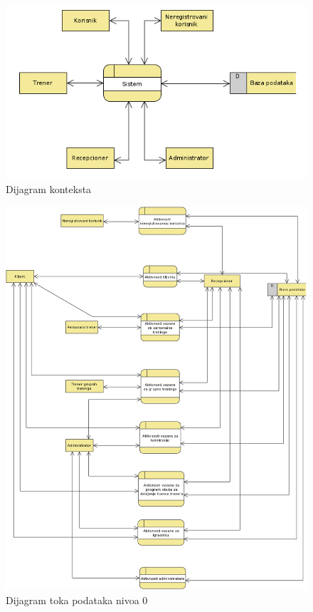\begin{figure}[!ht]
\begin{center}
\includegraphics[scale=0.55]{sections/images/dijagram_konteksta.png}
\end{center}
\caption{Dijagram konteksta}
\label{fig:kontekst}
\end{figure}

\newpage
\begin{figure}[!ht]
\begin{center}
\includegraphics[scale=0.45]{sections/images/dtp_nivoa_0.png}
\end{center}
\caption{Dijagram toka podataka nivoa 0}
\label{fig:kontekst}
\end{figure}